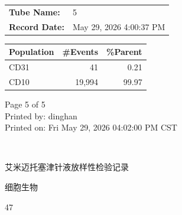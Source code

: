 \documentclass[UTF8,10pt,a4paper,fontset=fandol]{ctexart}
\newcommand{\fieldvalue}[1]{#1}
\newcommand{\handwritten}[1]{#1}
\begin{document}
\vspace{0.4em}

\begin{center}
\small
\begin{tabular}{|l|l|}
\hline
\textbf{Tube Name:} & 5\\
\textbf{Record Date:} & May 29, 2026 4:00:37 PM\\
\hline
\end{tabular}

\vspace{0.3em}

\begin{tabular}{|l|r|r|}
\hline
Population & \#Events & \%Parent\\
\hline
CD31 & 41 & 0.21\\
CD10 & 19,994 & 99.97\\
\hline
\end{tabular}
\end{center}

\vfill

\begin{flushright}
Page 5 of 5\\[0.2em]
Printed by: dinghan\\
Printed on: Fri May 29, 2026 04:02:00 PM CST
\end{flushright}

\vspace{1em}

\begin{flushright}
\handwritten{}\\
\handwritten{}
\end{flushright}

\newpage

\begin{center}
{\Large 艾米迈托塞津针液放样性检验记录}
\end{center}

\begin{flushright}
\fieldvalue{细胞生物}

\fieldvalue{47}
\end{flushright}
\end{document}
